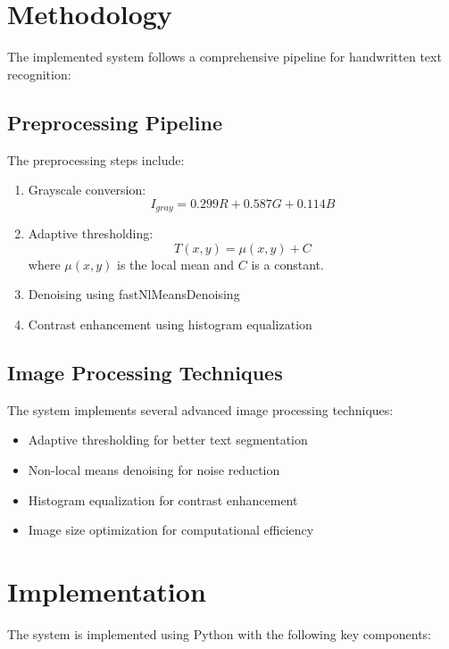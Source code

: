 \documentclass[a4paper,12pt]{article}
\begin{document}
\section{Methodology}
The implemented system follows a comprehensive pipeline for handwritten text recognition:

\subsection{Preprocessing Pipeline}
The preprocessing steps include:
\begin{enumerate}
    \item Grayscale conversion:
    \begin{equation}
        I_{gray} = 0.299R + 0.587G + 0.114B
    \end{equation}
    
    \item Adaptive thresholding:
    \begin{equation}
        T(x,y) = \mu(x,y) + C
    \end{equation}
    where $\mu(x,y)$ is the local mean and $C$ is a constant.
    
    \item Denoising using fastNlMeansDenoising
    \item Contrast enhancement using histogram equalization
\end{enumerate}

\subsection{Image Processing Techniques}
The system implements several advanced image processing techniques:
\begin{itemize}
    \item Adaptive thresholding for better text segmentation
    \item Non-local means denoising for noise reduction
    \item Histogram equalization for contrast enhancement
    \item Image size optimization for computational efficiency
\end{itemize}

\section{Implementation}
The system is implemented using Python with the following key components:
\end{document}

